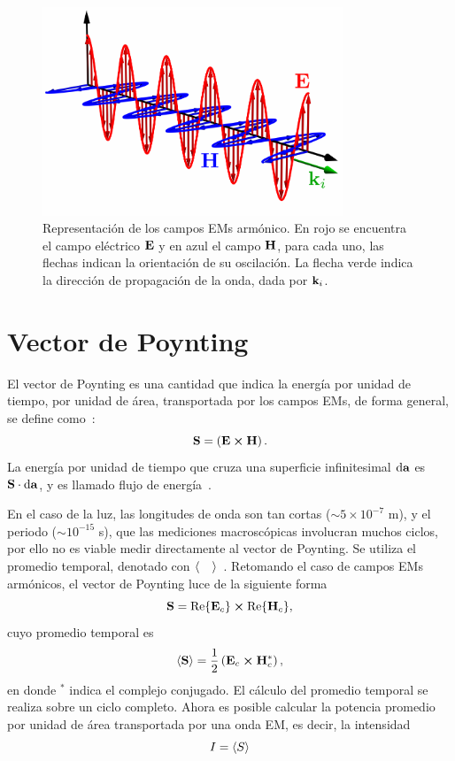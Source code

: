 \begin{figure}
	\centering
	\includegraphics[width=9cm]{1-Capitulo-Repaso/0-Diagramas/campos.pdf}\vspace*{-0.3cm}
	\caption[Campo eléctromagnetico armónico]{Representación de los campos EMs armónico. En rojo se encuentra el campo eléctrico $\vb{E}$ y en azul el campo $\vb{H}$, para cada uno, las flechas indican la orientación de su oscilación. La flecha verde indica la dirección de propagación de la onda, dada por $\vb{k}_{i}$.}\label{fig:EHFields}
\end{figure}
\section{Vector de Poynting}

El vector de Poynting es una cantidad que indica la energía por unidad de tiempo, por unidad de área, transportada por los campos EMs, de forma general, se define como~\cite{Griffiths}:
\begin{equation}
\vb{S}=\left(\vb{E} \cross \vb{H}\right).
\label{eq:poynting}
\end{equation}
La energía por unidad de tiempo que cruza una superficie infinitesimal $\dd{\vb{a}}$ es $\vb{S}\cdot\dd{\vb{a}}$, y es llamado flujo de energía~\cite{Griffiths}.

En el caso de la luz, las longitudes de onda son tan cortas ($\sim 5\times10^{-7}$ m), y el periodo ($\sim10^{-15}$ s), que las mediciones macroscópicas involucran muchos ciclos, por ello no es viable medir directamente al vector de Poynting. Se utiliza el promedio temporal, denotado con $\expval{\quad}$~\cite{Griffiths}. Retomando el caso de campos EMs armónicos, el vector de Poynting luce de la siguiente forma
\begin{equation}
\vb{S} = \Re{\vb{E}_{c}} \cross \Re{\vb{H}_{c}},
\end{equation}
cuyo promedio temporal es~\cite{BornWolf1980}
\begin{equation}
\expval{\vb{S}}=\frac{1}{2}\left(\vb{E}_{c} \cross \vb{H}_{c}^{*}\right),
\label{eq:poynting_promedio}
\end{equation}
en donde $^{*}$ indica el complejo conjugado. El cálculo del promedio temporal se realiza sobre un ciclo completo. Ahora es posible calcular la potencia promedio por unidad de área transportada por una onda EM, es decir, la intensidad~\cite{Griffiths}
\begin{equation}
	I=\expval{S}
\end{equation}

